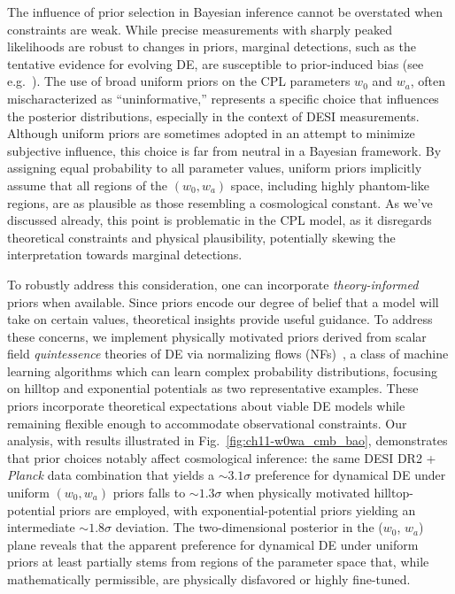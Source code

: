 The influence of prior selection in Bayesian inference cannot be overstated when constraints are weak. While precise measurements with sharply peaked likelihoods are robust to changes in priors, marginal detections, such as the tentative evidence for evolving DE, are susceptible to prior-induced bias (see e.g.~\cite{Steinhardt:2025znn,Bayat:2025xfr}). The use of broad uniform priors on the CPL parameters $w_0$ and $w_a$, often mischaracterized as ``uninformative,'' represents a specific choice that influences the posterior distributions, especially in the context of DESI measurements. Although uniform priors are sometimes adopted in an attempt to minimize subjective influence, this choice is far from neutral in a Bayesian framework. By assigning equal probability to all parameter values, uniform priors implicitly assume that all regions of the $(w_0, w_a)$ space, including highly phantom-like regions, are as plausible as those resembling a cosmological constant. As we've discussed already, this point is problematic in the CPL model, as it disregards theoretical constraints and physical plausibility, potentially skewing the interpretation towards marginal detections.


To robustly address this consideration, one can incorporate \textit{theory-informed} priors when available. Since priors encode our degree of belief that a model will take on certain values, theoretical insights provide useful guidance. To address these concerns, we implement physically motivated priors derived from scalar field {\it quintessence} theories of DE via normalizing flows (NFs)~\cite{2015arXiv150505770J, 2017arXiv170507057P},  a class of machine learning algorithms which can learn complex probability distributions,
focusing on hilltop and exponential potentials as two representative examples.
These priors incorporate theoretical expectations about viable DE models while remaining flexible enough to accommodate observational constraints. Our analysis, with results illustrated in Fig.~\ref{fig:ch11-w0wa_cmb_bao}, demonstrates that prior choices
notably affect cosmological inference: the same DESI DR2 + \textit{Planck} data combination that yields a $\sim 3.1\sigma$ preference for dynamical DE under uniform $(w_0,w_a)$ priors falls to $\sim 1.3\sigma$  when physically motivated hilltop-potential priors are employed, with exponential-potential priors yielding an intermediate $\sim 1.8\sigma$ deviation. The two-dimensional posterior in the ($w_0$, $w_a$) plane reveals that the apparent preference for dynamical DE under uniform priors
at least partially stems from regions of the parameter space that, while mathematically permissible, are physically disfavored or highly fine-tuned.



